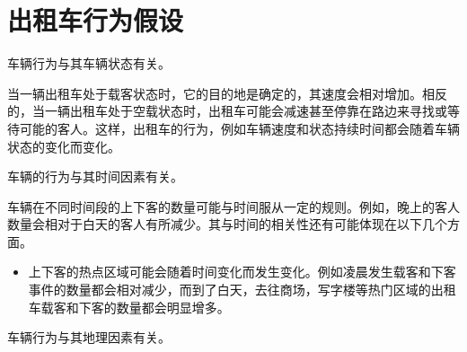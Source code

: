 \section{出租车行为假设}

\begin{assumption}
\label{assuption_1}
车辆行为与其车辆状态有关。
\end{assumption}

当一辆出租车处于载客状态时，它的目的地是确定的，其速度会相对增加。相反的，当一辆出租车处于空载状态时，出租车可能会减速甚至停靠在路边来寻找或等待可能的客人。这样，出租车的行为，例如车辆速度和状态持续时间都会随着车辆状态的变化而变化。

\begin{assumption}
\label{assuption_2}
车辆的行为与其时间因素有关。
\end{assumption}

车辆在不同时间段的上下客的数量可能与时间服从一定的规则。例如，晚上的客人数量会相对于白天的客人有所减少。其与时间的相关性还有可能体现在以下几个方面。

\begin{itemize}
\item 上下客的热点区域可能会随着时间变化而发生变化。例如凌晨发生载客和下客事件的数量都会相对减少，而到了白天，去往商场，写字楼等热门区域的出租车载客和下客的数量都会明显增多。
\end{itemize}



\begin{assumption}
\label{assuption_3}
车辆行为与其地理因素有关。
\end{assumption}


